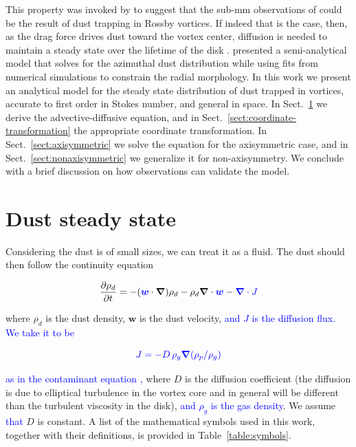 \documentclass[apj]{emulateapj}
\newcommand{\pderiv}[2]{\frac{\partial #1}{\partial #2}}
\renewcommand{\v}[1]{{\boldsymbol{#1}}} %
\def\blue#1{\textcolor{blue}{#1}}
\newcommand{\del}{\v{\nabla}}
\newcommand{\grad}{\del}
\newcommand{\Div}{\del\cdot}
\newcommand{\sect}[1]{Sect.~\ref{#1}}
\newcommand{\beq}{\begin{equation}}
\newcommand{\eeq}{\end{equation}}
\begin{document}
This property was invoked by \citet{Regaly12} to suggest that the 
sub-mm observations of \citet{Brown09} could be the result of dust
trapping in Rossby vortices. If indeed that is the case, then, 
as the drag force drives dust toward the vortex center, diffusion is
needed to maintain a steady state over the lifetime of the disk
\citep{Klahr-Henning97,Chavanis00}. \citet{Birnstiel13} presented a semi-analytical model that solves for the azimuthal dust 
distribution while using fits from numerical simulations
\citep{Pinilla12b} to constrain the radial morphology. In this work we present an analytical 
model for the steady state distribution of dust trapped in vortices, 
accurate to first order in Stokes number, and general in space. In 
\sect{sect:model-equations} we derive the
advective-diffusive equation, and in \sect{sect:coordinate-transformation} the appropriate coordinate
transformation. In \sect{sect:axisymmetric} we solve the equation for the axisymmetric
case, and in \sect{sect:nonaxisymmetric} we generalize it for non-axisymmetry. We conclude
with a brief discussion on how observations can validate the model. 

\section{Dust steady state} 
\label{sect:model-equations}

Considering the dust is of small sizes, we can treat it as a
fluid. The dust should then follow the continuity equation \blue{\citep{Morfill-Volk84,Clarke-Pringle88,Charnoz11}}

\beq
  \pderiv{\rho_d}{t} = -(\v{\blue{w}}\cdot\del)\rho_d - \rho_d \Div{\v{\blue{w}}} - \blue{\Div{J}}
  \label{eq:continuity-w}
\eeq

\noindent where $\rho_d$ is the dust density, $\v{w}$ is the dust
velocity, \blue{and $J$ is the diffusion flux. We take it to be}
 
\beq 
\blue{J=-D\,\rho_g\grad{\left(\rho_p/\rho_g\right)}}\label{eq:j-flux}
\eeq 

\noindent \blue{as in the contaminant equation
\citep{Morfill-Volk84,Clarke-Pringle88,Charnoz11},} where $D$ is the  
diffusion coefficient (the diffusion is due
to elliptical turbulence in the vortex core and in general will be
different than the turbulent viscosity in the disk), \blue{and $\rho_g$ is
the gas density}. We assume \blue{that} $D$ is constant. A list of the mathematical symbols used in this work, together
with their definitions, is provided in Table~\ref{table:symbols}. 
\end{document}
